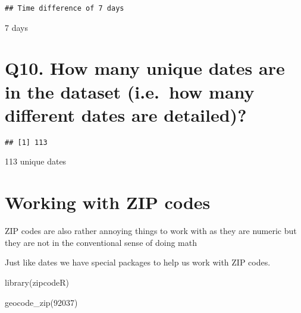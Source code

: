 \documentclass[
]{article}
\newenvironment{Shaded}{\begin{snugshade}}{\end{snugshade}}
\newcommand{\FunctionTok}[1]{\textcolor[rgb]{0.00,0.00,0.00}{#1}}
\newcommand{\NormalTok}[1]{#1}
\newcommand{\SpecialCharTok}[1]{\textcolor[rgb]{0.00,0.00,0.00}{#1}}
\newcommand{\StringTok}[1]{\textcolor[rgb]{0.31,0.60,0.02}{#1}}
\begin{document}
\begin{verbatim}
## Time difference of 7 days
\end{verbatim}

7 days

\hypertarget{q10.-how-many-unique-dates-are-in-the-dataset-i.e.-how-many-different-dates-are-detailed}{%
\section{Q10. How many unique dates are in the dataset (i.e.~how many
different dates are
detailed)?}\label{q10.-how-many-unique-dates-are-in-the-dataset-i.e.-how-many-different-dates-are-detailed}}

\begin{Shaded}
\end{Shaded}

\begin{verbatim}
## [1] 113
\end{verbatim}

113 unique dates

\hypertarget{working-with-zip-codes}{%
\section{Working with ZIP codes}\label{working-with-zip-codes}}

ZIP codes are also rather annoying things to work with as they are
numeric but they are not in the conventional sense of doing math

Just like dates we have special packages to help us work with ZIP codes.

\begin{Shaded}
\begin{Highlighting}[]
\FunctionTok{library}\NormalTok{(zipcodeR)}
\end{Highlighting}
\end{Shaded}

\begin{Shaded}
\begin{Highlighting}[]
\FunctionTok{geocode\_zip}\NormalTok{(}\StringTok{\textquotesingle{}92037\textquotesingle{}}\NormalTok{)}
\end{Highlighting}
\end{Shaded}
\end{document}
